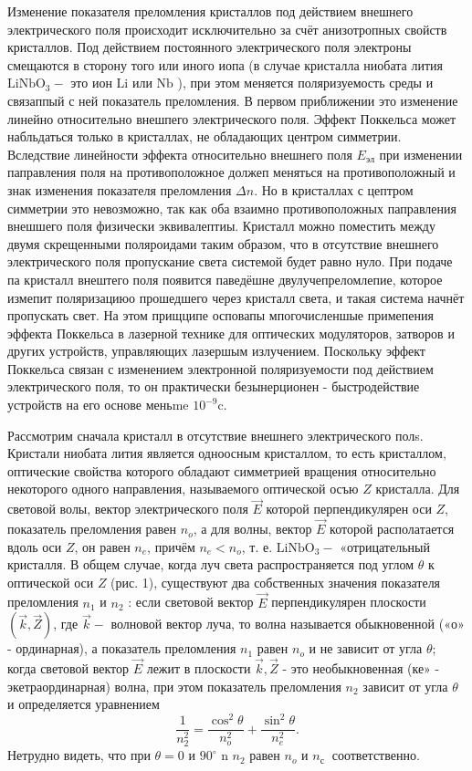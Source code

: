 \documentclass[a4paper, 12pt]{article}
\begin{document}
Изменение показателя преломления кристаллов под действием внешнего электрического поля происходит исключительно за счёт анизотропных свойств кристаллов. Под действием постоянного электрического поля электроны смещаются в сторону того или иного иопа (в случае кристалла ниобата лития $\mathrm{LiNbO}_3-$ это ион $\mathrm{Li}$ или $\mathrm{Nb}$ ), при этом меняется поляризуемость среды и связаппый с ней показатель преломления. В первом приближении это изменение линейно относительно внешпего электрического поля. Эффект Поккельса может набльдаться только в кристаллах, не обладающих центром симметрии. Вследствие линейности эффекта относительно внешнего поля $E_{эл}$ при изменении паправления поля на противоположное должеп меняться на противоположный и знак изменения показателя преломления $\Delta n$. Но в кристаллах с цептром симметрии это невозможно, так как оба взаимно противоположных паправления внешшего поля физически эквивалептиы. Кристалл можно поместить между двумя скрещенными поляроидами таким образом, что в отсутствие внешнего электрического поля пропускание света системой будет равно нуло. При подаче па кристалл внештего поля появится паведёшне двулучепреломлепие, которое измепит поляризациюо прошедшего через кристалл света, и такая система начнёт пропускать свет. На этом прищципе осповапы мпогочисленшые примепения эффекта Поккельса в
лазерной технике для оптических модуляторов, затворов и других устройств, управляющих лазершым излучением. Поскольку эффект Поккельса связан с изменением электронной поляризуемости под действием электрического поля, то он практически безынерционен - быстродействие устройств на его основе меньme $10^{-9} \mathrm{c}$.

Рассмотрим сначала кристалл в отсутствие внешнего электрического полs. Кристали ниобата лития является одноосным кристаллом, то есть кристаллом, оптические свойства которого обладают симметрией вращения относительно некоторого одного направления, называемого оптической осъю $Z$ кристалла. Для световой волы, вектор электрического поля $\vec{E}$ которой перпендикулярен оси $Z$, показатель преломления равен $n_o$, а для волны, вектор $\vec{E}$ которой располатается вдоль оси $Z$, он равен $n_e$, причём $n_e<n_o$, т. е. $\mathrm{LiNbO}_3-$ «отрицательный кристалля. В общем случае, когда луч света распространяется под углом $\theta$ к оптической оси $Z$ (рис. 1), существуют два собственных значения показателя преломления $n_1$ и $n_2$ : если световой вектор $\vec{E}$ перпендикулярен плоскости $(\vec{k}, \vec{Z})$, где $\vec{k}-$ волновой вектор луча, то волна называется обыкновенной («о» - ординарная), а показатель преломления $n_1$ равен $n_o$ и не зависит от угла $\theta$; когда световой вектор $\vec{E}$ лежит в плоскости $\vec{k}, \vec{Z}$ - это необыкновенная (ке» - экетраординарная) волна, при этом показатель преломления $n_2$ зависит от угла $\theta$ и определяется уравнением
\begin{equation}
\frac{1}{n_2^2}=\frac{\cos ^2 \theta}{n_o^2}+\frac{\sin ^2 \theta}{n_e^2} .
\end{equation}
Нетрудно видеть, что при $\theta=0$ и $90^{\circ}$ n $n_2$ равен $n_o$ и $n_{\text {с  }}$ соответственно.
\end{document}
